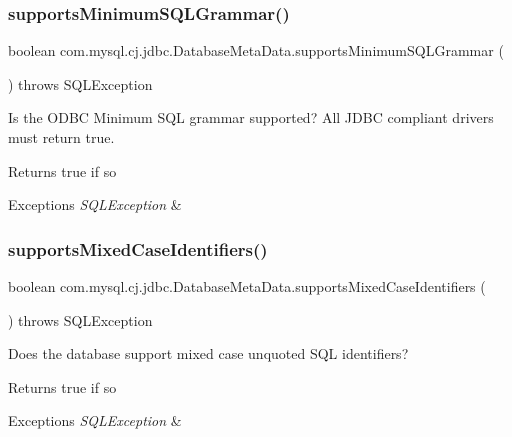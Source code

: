 \subsubsection{\texorpdfstring{supports\+Minimum\+S\+Q\+L\+Grammar()}{supportsMinimumSQLGrammar()}}
{\footnotesize\ttfamily boolean com.\+mysql.\+cj.\+jdbc.\+Database\+Meta\+Data.\+supports\+Minimum\+S\+Q\+L\+Grammar (\begin{DoxyParamCaption}{ }\end{DoxyParamCaption}) throws S\+Q\+L\+Exception}

Is the O\+D\+BC Minimum S\+QL grammar supported? All J\+D\+BC compliant drivers must return true.

\begin{DoxyReturn}{Returns}
true if so 
\end{DoxyReturn}

\begin{DoxyExceptions}{Exceptions}
{\em S\+Q\+L\+Exception} & \\
\hline
\end{DoxyExceptions}
\mbox{\label{classcom_1_1mysql_1_1cj_1_1jdbc_1_1_database_meta_data_af9e1b9edcaf35b135c9fb44aaa03f99a}} 
\subsubsection{\texorpdfstring{supports\+Mixed\+Case\+Identifiers()}{supportsMixedCaseIdentifiers()}}
{\footnotesize\ttfamily boolean com.\+mysql.\+cj.\+jdbc.\+Database\+Meta\+Data.\+supports\+Mixed\+Case\+Identifiers (\begin{DoxyParamCaption}{ }\end{DoxyParamCaption}) throws S\+Q\+L\+Exception}

Does the database support mixed case unquoted S\+QL identifiers?

\begin{DoxyReturn}{Returns}
true if so 
\end{DoxyReturn}

\begin{DoxyExceptions}{Exceptions}
{\em S\+Q\+L\+Exception} & \\
\hline
\end{DoxyExceptions}
\mbox{\label{classcom_1_1mysql_1_1cj_1_1jdbc_1_1_database_meta_data_ac7f546c53a94116455183e4d16331940}} 
